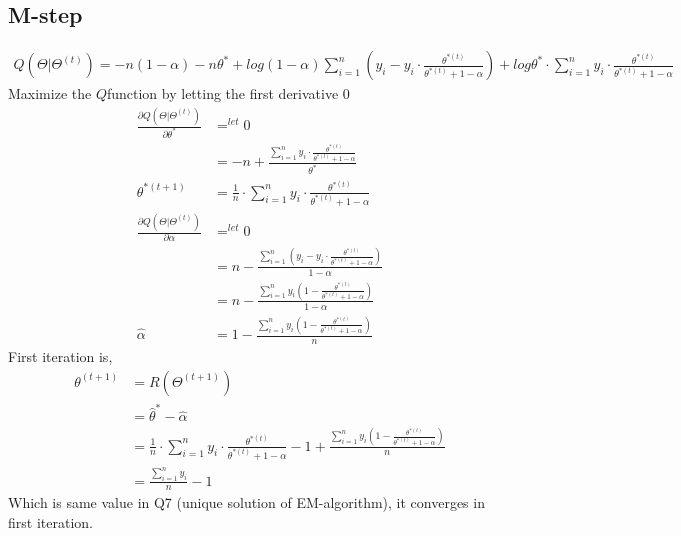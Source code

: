 \documentclass[11pt]{article}
\begin{document}
\subsection{M-step}
\begin{align*}
Q(\Theta | \Theta^{(t)}) = -n(1-\alpha) -n\theta^* +log(1-\alpha)\sum_{i=1}^{n}(y_i - y_i\cdot\frac{\theta^{*(t)}}{\theta^{*(t)} + 1 -\alpha}) + log\theta^* \cdot \sum_{i=1}^{n}y_i\cdot\frac{\theta^{*(t)}}{\theta^{*(t)} + 1 -\alpha}
\end{align*}
Maximize the $Q$function by letting the first derivative 0
\begin{align*}
\frac{\partial Q(\Theta | \Theta^{(t)})}{\partial \theta^*} &=^{let} 0\\
&=-n + \frac{\sum_{i=1}^{n}y_i\cdot\frac{\theta^{*(t)}}{\theta^{*(t)} + 1 -\alpha}}{\theta^*}\\
\theta^{*(t+1)} &= \frac{1}{n}\cdot \sum_{i=1}^{n}y_i\cdot\frac{\theta^{*(t)}}{\theta^{*(t)} + 1 -\alpha}\\
\frac{\partial Q(\Theta | \Theta^{(t)})}{\partial \alpha} &=^{let} 0\\
&= n - \frac{\sum_{i=1}^{n}\left( y_i -y_i\cdot\frac{\theta^{*(t)}}{\theta^{*(t)} + 1 -\alpha} \right)}{1-\alpha}\\
&= n - \frac{\sum_{i=1}^{n}y_i\left(1-\frac{\theta^{*(t)}}{\theta^{*(t)} + 1 -\alpha} \right)}{1-\alpha}\\
\hat{\alpha} &= 1 - \frac{\sum_{i=1}^{n}y_i\left(1-\frac{\theta^{*(t)}}{\theta^{*(t)} + 1 -\alpha} \right)}{n}
\end{align*}
First iteration is,
\begin{align*}
\theta^{(t+1)} &= R(\Theta^{(t+1)})\\
&=\hat{\theta}^* - \hat{\alpha}\\
&=\frac{1}{n}\cdot \sum_{i=1}^{n}y_i\cdot\frac{\theta^{*(t)}}{\theta^{*(t)} + 1 -\alpha} - 1 + \frac{\sum_{i=1}^{n}y_i\left(1-\frac{\theta^{*(t)}}{\theta^{*(t)} + 1 -\alpha} \right)}{n}\\
&=\frac{\sum_{i=1}^{n}y_i}{n} -1
\end{align*}
Which is same value in Q7 (unique solution of EM-algorithm), it converges in first iteration.
\end{document}

